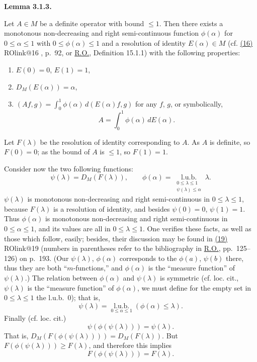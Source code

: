 \documentclass[twoside,leqno]{article}
\makeatletter
\newcommand{\DM}{D_{M}}
\newcommand{\RO}{\href{https://doi.org/10.2307/1968693}{R.O.}}
\newcommand{\ROcite}[1]{%
  \@ifundefined{ROlink@#1}
    {\href{https://doi.org/10.2307/1968693}{(#1)}}
    {\csname ROlink@#1\endcsname{(#1)}}%
}
\newcommand{\StatementTarget}[1]{\phantomsection\hypertarget{stmt:#1}{}}
\newcommand{\EquationTarget}[1]{\hypertarget{eq:#1}{}}
\newenvironment{statement}[2]{%
  \par\medskip
  \noindent\StatementTarget{#1}\hspace*{\parindent}\textbf{#2.}\ \itshape\ignorespaces
}{\par}
\makeatother
\begin{document}
\begin{statement}{lemma:3.1.3}{Lemma 3.1.3}
Let $A\in M$ be a definite operator with bound $\leq1$. Then there
exists a monotonous non-decreasing and right semi-continuous function $\phi(\alpha)$ for
$0\leq\alpha\leq1$ with $0\leq\phi(\alpha)\leq1$ and a resolution of identity $E(\alpha)\in M$
(cf. \ROcite{16}, p.~92, or \RO{}, Definition 15.1.1) with the following properties:
\begin{enumerate}[label=(\roman*)]
 \item $E(0)=0$, $E(1)=1$,
 \item $\DM(E(\alpha))=\alpha$,
 \item $(Af,g)=\int_0^1\phi(\alpha)\,d(E(\alpha)f,g)$ for any $f$, $g$, or symbolically,
 \[
   A=\int_0^1\phi(\alpha)\,dE(\alpha).
 \]
\end{enumerate}
\end{statement}

Let $F(\lambda)$ be the resolution of identity corresponding to $A$. As $A$ is definite,
so $F(0)=0$; as the bound of $A$ is $\leq1$, so $F(1)=1$.

Consider now the two following functions:
\[
 \psi(\lambda)=\DM(F(\lambda)),
 \qquad
 \phi(\alpha)=\operatorname*{l.u.b.}_{\substack{0\leq\lambda\leq1\\ \psi(\lambda)\leq\alpha}}\lambda.
\]
$\psi(\lambda)$ is monotonous non-decreasing and right semi-continuous in
$0\leq\lambda\leq1$, because $F(\lambda)$ is a resolution of identity, and besides
$\psi(0)=0$, $\psi(1)=1$. Thus $\phi(\alpha)$ is monotonous non-decreasing and right
semi-continuous in $0\leq\alpha\leq1$, and its values are all in $0\leq\lambda\leq1$.
One verifies these facts, as well as those which follow, easily; besides, their
discussion may be found in \ROcite{19} (numbers in parentheses refer to the bibliography
in \RO{}, pp.~125--126) on p.~193. (Our $\psi(\lambda)$, $\phi(\alpha)$ corresponds to the
$\phi(a)$, $\psi(b)$ there, thus they are both ``$m$-functions,'' and $\phi(\alpha)$ is the
``measure function'' of $\psi(\lambda)$.) The relation between $\phi(\alpha)$ and
$\psi(\lambda)$ is symmetric (cf. loc. cit., $\psi(\lambda)$ is the ``measure function''
of $\phi(\alpha)$, we must define for the empty set in $0\leq\lambda\leq1$ the l.u.b.~0);
that is,
\[
 \psi(\lambda)=\operatorname*{l.u.b.}_{0\leq\alpha\leq1}(\phi(\alpha)\leq\lambda).
\]
Finally (cf. loc. cit.)
\EquationTarget{star}
\begin{equation*}
 \psi(\phi(\psi(\lambda)))=\psi(\lambda). \tag{$*$}
\end{equation*}
That is, $\DM(F(\phi(\psi(\lambda))))=\DM(F(\lambda))$. But
$F(\phi(\psi(\lambda)))\geq F(\lambda)$, and therefore this implies
\EquationTarget{starstar}
\begin{equation*}
 F(\phi(\psi(\lambda)))=F(\lambda). \tag{$*\,*$}
\end{equation*}
\end{document}
